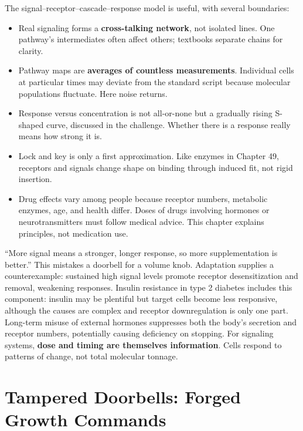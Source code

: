 The signal--receptor--cascade--response model is useful, with several boundaries:

\begin{itemize}[itemsep=2pt]
\item Real signaling forms a \textbf{cross-talking network}, not isolated lines. One pathway's intermediates often affect others; textbooks separate chains for clarity.
\item Pathway maps are \textbf{averages of countless measurements}. Individual cells at particular times may deviate from the standard script because molecular populations fluctuate. Here noise returns.
\item Response versus concentration is not all-or-none but a gradually rising S-shaped curve, discussed in the challenge. Whether there is a response really means how strong it is.
\item Lock and key is only a first approximation. Like enzymes in Chapter 49, receptors and signals change shape on binding through induced fit, not rigid insertion.
\item Drug effects vary among people because receptor numbers, metabolic enzymes, age, and health differ. Doses of drugs involving hormones or neurotransmitters must follow medical advice. This chapter explains principles, not medication use.
\end{itemize}

\begin{wuqu}
``More signal means a stronger, longer response, so more supplementation is better.'' This mistakes a doorbell for a volume knob. Adaptation supplies a counterexample: sustained high signal levels promote receptor desensitization and removal, weakening responses. Insulin resistance in type 2 diabetes includes this component: insulin may be plentiful but target cells become less responsive, although the causes are complex and receptor downregulation is only one part. Long-term misuse of external hormones suppresses both the body's secretion and receptor numbers, potentially causing deficiency on stopping. For signaling systems, \textbf{dose and timing are themselves information}. Cells respond to patterns of change, not total molecular tonnage.
\end{wuqu}

\section{Tampered Doorbells: Forged Growth Commands}

